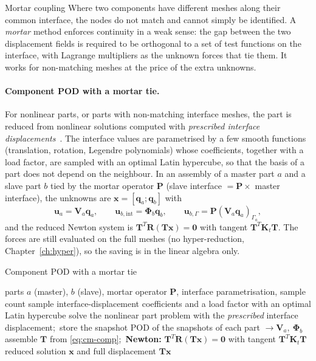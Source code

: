 
\begin{sidenote}{Mortar coupling}
Where two components have different meshes along their common interface, the nodes do not match and cannot simply be identified. A \emph{mortar} method enforces continuity in a weak sense: the gap between the two displacement fields is required to be orthogonal to a set of test functions on the interface, with Lagrange multipliers as the unknown forces that tie them. It works for non-matching meshes at the price of the extra unknowns.
\end{sidenote}

\paragraph{Component POD with a mortar tie.}
For nonlinear parts, or parts with non-matching interface meshes, the part is reduced from nonlinear solutions computed with \emph{prescribed interface displacements}~\cite{ritzert2025}. The interface values are parametrised by a few smooth functions (translation, rotation, Legendre polynomials) whose coefficients, together with a load factor, are sampled with an optimal Latin hypercube, so that the basis of a part does not depend on the neighbour. In an assembly of a master part $a$ and a slave part $b$ tied by the mortar operator $\bm P$ (slave interface $=\bm P\times$ master interface), the unknowns are $\bm x=[\bm q_a;\bm q_b]$ with
\begin{equation}\label{eq:cm-comp}
\bm u_a=\bm V_a\bm q_a,\qquad \bm u_{b,\mathrm{int}}=\bm\Phi_b\bm q_b,\qquad \bm u_{b,\Gamma}=\bm P(\bm V_a\bm q_a)_{\Gamma_a},
\end{equation}
and the reduced Newton system is $\bm T^T\bm R(\bm T\bm x)=\bm 0$ with tangent $\bm T^T\bm K_t\bm T$. The forces are still evaluated on the full meshes (no hyper-reduction, Chapter~\ref{ch:hyper}), so the saving is in the linear algebra only.

\begin{algbox}{Component POD with a mortar tie}
\begin{pseudo}
\Require parts $a$ (master), $b$ (slave), mortar operator $\bm P$, interface parametrisation, sample count
\State sample interface-displacement coefficients and a load factor with an optimal Latin hypercube
  \State solve the nonlinear part problem with the \emph{prescribed} interface displacement;\ store the snapshot
\EndFor
\State POD of the snapshots of each part $\to\bm V_a,\ \bm\Phi_b$ 
\State assemble $\bm T$ from \eqref{eq:cm-comp};\ \textbf{Newton:} $\bm T^T\bm R(\bm T\bm x)=\bm0$ with tangent $\bm T^T\bm K_t\bm T$
\Ensure reduced solution $\bm x$ and full displacement $\bm T\bm x$
\end{pseudo}
\end{algbox}

